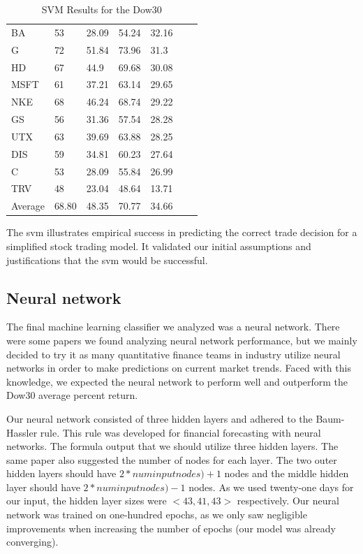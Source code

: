 \documentclass{article}
\begin{document}
\begin{table}[h!]
\begin{tabular}{@{}lllllll@{}}
    BA & 53 & 28.09 & 54.24 & 32.16 & \\
    G & 72 & 51.84 & 73.96 & 31.3 & \\
    HD & 67 & 44.9 & 69.68 & 30.08 & \\
    MSFT & 61 & 37.21 & 63.14 & 29.65 & \\
    NKE & 68 & 46.24 & 68.74 & 29.22 & \\
    GS & 56 & 31.36 & 57.54 & 28.28 & \\
    UTX & 63 & 39.69 & 63.88 & 28.25 & \\
    DIS & 59 & 34.81 & 60.23 & 27.64 & \\
    C & 53 & 28.09 & 55.84 & 26.99 & \\
    TRV & 48 & 23.04 & 48.64 & 13.71 & \\ \bottomrule
    Average & 68.80 & 48.35 & 70.77 & 34.66 & \\
  \end{tabular}
  \caption{SVM Results for the Dow30}
  \label{my-label}
\end{table}

The svm illustrates empirical success in predicting the correct trade decision for a simplified stock trading model. It validated our initial assumptions and justifications that the svm would be successful.

\subsection{Neural network}
The final machine learning classifier we analyzed was a neural network. There were some papers we found analyzing neural network performance, but we mainly decided to try it as many quantitative finance teams in industry utilize neural networks in order to make predictions on current market trends. Faced with this knowledge, we expected the neural network to perform well and outperform the Dow30 average percent return.

Our neural network consisted of three hidden layers and adhered to the Baum-Hassler rule. This rule was developed for financial forecasting with neural networks. The formula output that we should utilize three hidden layers. The same paper also suggested the number of nodes for each layer. The two outer hidden layers should have $2*num input nodes) + 1$ nodes and the middle hidden layer should have $2*num input nodes) - 1$ nodes. As we used twenty-one days for our input, the hidden layer sizes were $<43,41,43>$ respectively. Our neural network was trained on one-hundred epochs, as we only saw negligible improvements when increasing the number of epochs (our model was already converging).
\end{document}
